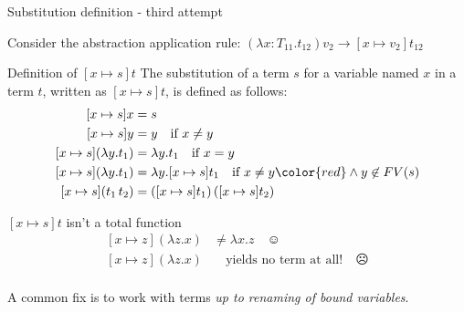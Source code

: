 \documentclass[8pt]{beamer}
\begin{document}
\begin{frame}{Substitution definition - third attempt}

    Consider the abstraction application rule:
        $(\lambda x:T_{11}.t_{12})v_{2} \rightarrow [x \mapsto v_{2}]t_{12}$

    \pause

    \begin{block}{Definition of $[x \mapsto s]t$}
        The substitution of a term $s$ for a variable named $x$ in a term $t$,
        written as $[x \mapsto s]t$, is defined as follows:
        \begin{displaymath}
            \begin{split}
                [x \mapsto s]x &= s \\
                [x \mapsto s]y &= y \quad \text{if } x \not = y\\
                [x \mapsto s](\lambda y.t_{1}) &= \lambda y. t_{1} \quad \text{if } x = y\\
                [x \mapsto s](\lambda y.t_{1}) &= \lambda y. [x \mapsto s]t_{1} 
                                    \quad \text{if } x \not = y 
                                    {\color{red}\wedge y \not \in FV(s)}\\
                [x \mapsto s](t_{1} \, t_{2}) &= 
                    ([x \mapsto s]t_{1})\, ([x \mapsto s]t_{2})\\
            \end{split}
        \end{displaymath}        
    \end{block}

    \pause

    \begin{alertblock}{$[x \mapsto s]t$ isn't a total function}
        \begin{displaymath}
            \begin{split}
                [x \mapsto z](\lambda z.x) &\not = \lambda x.z \quad \smiley\\ 
                [x \mapsto z](\lambda z.x) &\quad \text{yields no term at all!} \quad \frownie\\
            \end{split}
        \end{displaymath}
    \end{alertblock}
    \pause
    A common fix is to work with terms \emph{up to renaming of bound variables}.
\end{frame}
\end{document}
